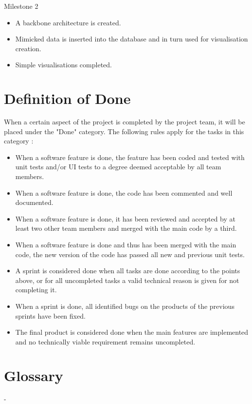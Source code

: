 \documentclass{article}
\begin{document}
    Milestone 2
    \begin{itemize}
        \item A backbone architecture is created.
        \item Mimicked data is inserted into the database and in turn used for visualisation creation.
        \item Simple visualisations completed.
    \end{itemize}
    
\section{Definition of Done}

When a certain aspect of the project is completed by the project team, it will be placed under the "Done" category. The following rules apply for the tasks in this category : 

\begin{itemize}
    \item When a software feature is done, the feature has been coded and tested with unit tests and/or UI tests to a degree deemed acceptable by all team members.
    \item When a software feature is done, the code has been commented and well documented.
    \item When a software feature is done, it has been reviewed and accepted by at least two other team members and merged with the main code by a third.
    \item When a software feature is done and thus has been merged with the main code, the new version of the code has passed all new and previous unit tests.
    \item A sprint is considered done when all tasks are done according to the points above, or for all uncompleted tasks a valid technical reason is given for not completing it.
    \item When a sprint is done, all identified bugs on the products of the previous sprints have been fixed.
    \item The final product is considered done when the main features are implemented and no technically viable requirement remains uncompleted.
\end{itemize}

\section{Glossary}
-



\end{document}
